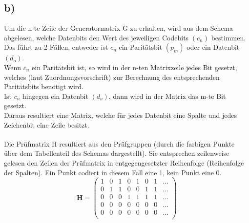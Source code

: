 \documentclass[a4paper]{scrartcl}
\begin{document}
	\subsection{b)}
		Um die n-te Zeile der Generatormatrix G zu erhalten, wird aus dem Schema abgelesen, welche 	
		Datenbits den Wert des jeweiligen Codebits \((c_n)\) bestimmen. Das führt zu 2 Fällen, 
		entweder ist \(c_n\) ein Paritätsbit \((p_m)\) oder ein Datenbit \((d_o)\). \\
		Wenn \(c_n\) ein Paritätsbit ist, so wird in der n-ten Matrixzeile jedes Bit gesetzt, welches 
		(laut Zuordnungsvorschrift) zur Berechnung des entsprechenden Paritätsbits benötigt wird. \\
		Ist \(c_n\) hingegen ein Datenbit \((d_o)\), dann wird in der Matrix das m-te Bit gesetzt. \\
		Daraus resultiert eine Matrix, welche für jedes Datenbit eine Spalte und jedes Zeichenbit 
		eine Zeile besitzt. \\ 
		\\	
		Die Prüfmatrix H resultiert aus den Prüfgruppen (durch die farbigen Punkte über dem 
		Tabellenteil des Schemas dargestellt). Sie entsprechen zeilenweise gelesen den Zeilen der 
		Prüfmatrix in entgegengesetzter Reihenfolge (Reihenfolge der Spalten). Ein Punkt codiert in 
		diesem Fall eine 1, kein Punkt eine 0. \\
		\[\textbf{H}=\begin{pmatrix}
			1&0&1&0&1&0&1&... \\
			0&1&1&0&0&1&1&... \\
			0&0&0&1&1&1&1&... \\
			0&0&0&0&0&0&0&... \\
			0&0&0&0&0&0&0&... \\
		\end{pmatrix}\]
\end{document}
